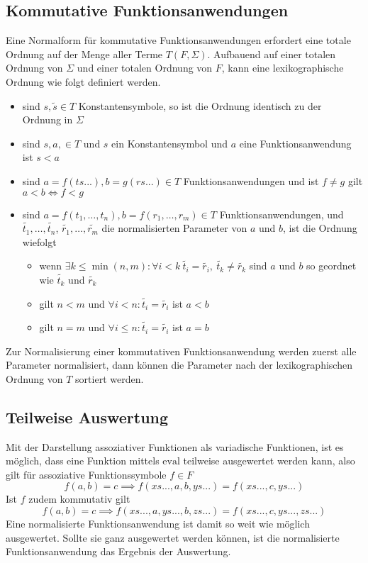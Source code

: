\documentclass{article}
\begin{document}
\subsection{Kommutative Funktionsanwendungen}
Eine Normalform für kommutative Funktionsanwendungen erfordert eine totale Ordnung auf der Menge aller Terme $T(F, \Sigma)$. Aufbauend auf einer totalen Ordnung von $\Sigma$ und einer totalen Ordnung von $F$, kann eine lexikographische Ordnung wie folgt definiert werden. 
\begin{itemize}
	\item{sind $s, \tilde{s} \in T$ Konstantensymbole, so ist die Ordnung identisch zu der Ordnung in $\Sigma$}
	\item{sind $s, a, \in T$ und $s$ ein Konstantensymbol und $a$ eine Funktionsanwendung ist $s < a$ }
	\item{sind $a = f(ts...), b = g(rs...) \in T$ Funktionsanwendungen und ist $f \neq g$ gilt $a < b \iff f < g $}
	\item{sind $a = f(t_1, \dots, t_n), b = f(r_1, \dots, r_m) \in T$ Funktionsanwendungen, und $\tilde{t_1}, \dots, \tilde{t_n}$, $\tilde{r_1}, \dots, \tilde{r_m}$ die normalisierten Parameter von $a$ und $b$, ist die Ordnung wiefolgt}
	\begin{itemize}
		\item{wenn $\exists k \leq \min{(n, m)} \colon \forall i < k ~ \tilde{t_i} = \tilde{r_i} ,~ \tilde{t_k} \neq \tilde{r_k} $ sind $a$ und $b$ so geordnet wie $\tilde{t_k}$ und $\tilde{r_k}$}
		\item{gilt $n < m$ und $\forall i < n\colon \tilde{t_i} = \tilde{r_i}$ ist $a < b$}
		\item{gilt $n = m$ und $\forall i \leq n\colon \tilde{t_i} = \tilde{r_i}$ ist $a = b$}
	\end{itemize}
\end{itemize}
Zur Normalisierung einer kommutativen Funktionsanwendung werden zuerst alle Parameter normalisiert, dann können die Parameter nach der lexikographischen Ordnung von $T$ sortiert werden.

\subsection{Teilweise Auswertung}
Mit der Darstellung assoziativer Funktionen als variadische Funktionen, ist es möglich, dass eine Funktion mittels $\mathrm{eval}$ teilweise ausgewertet werden kann, also gilt für assoziative Funktionssymbole $f \in F$
$$f(a, b) = c \implies f(xs..., a, b, ys...) = f(xs..., c, ys...)$$
Ist $f$ zudem kommutativ gilt 
$$f(a, b) = c \implies f(xs..., a, ys..., b, zs...) = f(xs..., c, ys..., zs...)$$
Eine normalisierte Funktionsanwendung ist damit so weit wie möglich ausgewertet. Sollte sie ganz ausgewertet werden können, ist die normalisierte Funktionsanwendung das Ergebnis der Auswertung.
\end{document}
